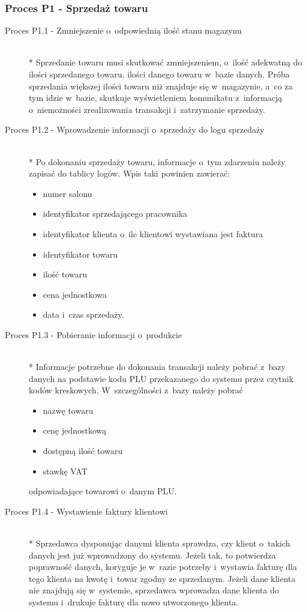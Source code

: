 \subsubsection{Proces P1 - Sprzedaż towaru}
\begin{description}
\item[Proces P1.1 - Zmniejszenie o~odpowiednią ilość stanu magazynu] ~\\*
Sprzedanie towaru musi skutkować zmniejszeniem, o~ilość adekwatną do ilości sprzedanego towaru, ilości danego towaru w~bazie danych. Próba sprzedania większej ilości towaru niż znajduje się w~magazynie, a~co za tym idzie w~bazie, skutkuje wyświetleniem komunikatu z~informacją o~niemożności zrealizowania transakcji i~zatrzymanie sprzedaży.
\item[Proces P1.2 - Wprowadzenie informacji o~sprzedaży do logu sprzedaży] ~\\*
Po dokonaniu sprzedaży towaru, informacje o~tym zdarzeniu należy zapisać do tablicy logów. Wpis taki powinien zawierać:
\begin{itemize}
\item numer salonu
\item identyfikator sprzedającego pracownika
\item identyfikator klienta o~ile klientowi wystawiana jest faktura
\item identyfikator towaru
\item ilość towaru
\item cena jednostkowa
\item data i~czas sprzedaży.
\end{itemize}
\item[Proces P1.3 - Pobieranie informacji o~produkcie]  ~\\*
Informacje potrzebne do dokonania transakcji należy pobrać z~bazy danych na podstawie kodu PLU przekazanego do systemu przez czytnik kodów kreskowych. W~szczególności z~bazy należy pobrać
\begin{itemize}
\item nazwę towaru
\item cenę jednostkową
\item dostępną ilość towaru
\item stawkę VAT
\end{itemize}
odpowiadające towarowi o~danym PLU.
\item[Proces P1.4 - Wystawienie faktury klientowi]  ~\\*
Sprzedawca dysponując danymi klienta sprawdza, czy klient o~takich danych jest już wprowadzony do systemu. Jeżeli tak, to potwierdza poprawność danych, koryguje je w~razie potrzeby i~wystawia fakturę dla tego klienta na kwotę i~towar zgodny ze sprzedanym. Jeżeli dane klienta nie znajdują się w~systemie, sprzedawca wprowadza dane klienta do systemu i~drukuje fakturę dla nowo utworzonego klienta.
\end{description}
